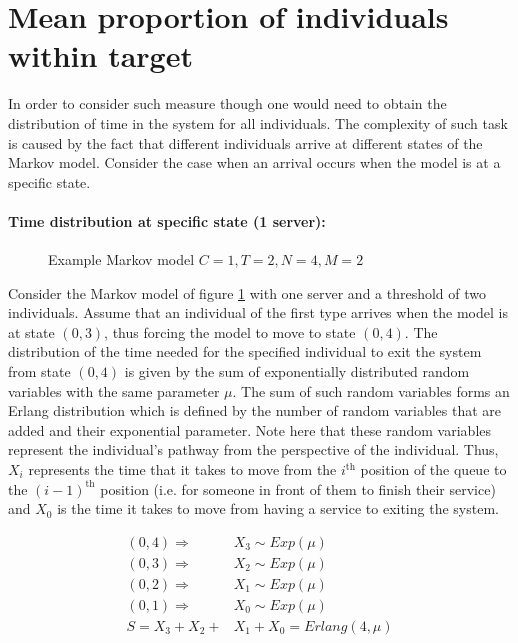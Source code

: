 \section{Mean proportion of individuals within target} 
\label{sec:appendix_mean_proportion}
    
In order to consider such measure though one would need to obtain the 
distribution of time in the system for all individuals. 
The complexity of such task is caused by the fact that different individuals 
arrive at different states of the Markov model. 
Consider the case when an arrival occurs when the model is at a specific state.

\paragraph{Time distribution at specific state (1 server):}

\begin{figure}[H]
    \centering
    \scalebox{0.75}{
        
    }
    \caption{Example Markov model \(C=1, T=2, N=4, M=2\)}
    \label{fig:distribution_of_time_at_specific_state_1_server}
\end{figure}

Consider the Markov model of figure 
\ref{fig:distribution_of_time_at_specific_state_1_server} with one server and a 
threshold of two individuals. 
Assume that an individual of the first type arrives when the model is at state 
\((0,3)\), thus forcing the model to move to state \((0,4)\). 
The distribution of the time needed for the specified individual to exit the 
system from state \((0,4)\) is given by the sum of exponentially distributed 
random variables with the same parameter \(\mu\). 
The sum of such random variables forms an Erlang distribution which is defined 
by the number of random variables that are added and their exponential 
parameter.
Note here that these random variables represent the individual's pathway from 
the perspective of the individual. 
Thus, \(X_i\) represents the time that it takes to move from the 
\(i^{\text{th}}\) position of the queue to the \((i-1)^{\text{th}}\) position 
(i.e. for someone in front of them to finish their service) and \(X_0\) is the 
time it takes to move from having a service to exiting the system.

\begin{align}
    (0,4) \Rightarrow \quad & X_3 \sim Exp(\mu) \nonumber \\
    (0,3) \Rightarrow \quad & X_2 \sim Exp(\mu) \nonumber \\
    (0,2) \Rightarrow \quad & X_1 \sim Exp(\mu) \nonumber \\
    (0,1) \Rightarrow \quad & X_0 \sim Exp(\mu) \nonumber \\
    S = X_3 + X_2 + & X_1 + X_0 = Erlang(4, \mu)
\end{align}

